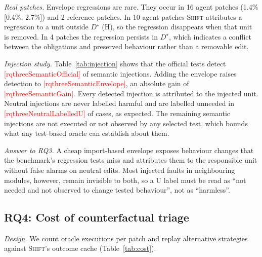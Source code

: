 \documentclass[a4paper,fleqn]{cas-sc}
\newcommand{\tool}{\textsc{Shift}}
\newcommand{\pending}[1]{\textcolor{red}{[#1]}}
\newcommand{\lab}[1]{\textsf{#1}}
\newcommand{\rqthreeAgentHarmful}{10}
\newcommand{\rqthreeAgentRegCI}{[0.4\%, 2.7\%]}
\newcommand{\rqthreeAgentRegMinimal}{4}
\newcommand{\rqthreeAgentRegN}{16}
\newcommand{\rqthreeAgentRegRate}{1.4\%}
\newcommand{\rqthreeGoldRegN}{2}
\newcommand{\rqthreeNeutralLabelledU}{\pending{rqthreeNeutralLabelledU}}
\newcommand{\rqthreeSemanticEnvelope}{\pending{rqthreeSemanticEnvelope}}
\newcommand{\rqthreeSemanticGain}{\pending{rqthreeSemanticGain}}
\newcommand{\rqthreeSemanticOfficial}{\pending{rqthreeSemanticOfficial}}
\begin{document}
\emph{Real patches.} Envelope regressions are rare. They occur in \rqthreeAgentRegN{} agent patches (\rqthreeAgentRegRate{} \rqthreeAgentRegCI{}) and \rqthreeGoldRegN{} reference patches. In \rqthreeAgentHarmful{} agent patches \tool{} attributes a regression to a unit outside $D^\star$ (\lab{H}), so the regression disappears when that unit is removed. In \rqthreeAgentRegMinimal{} patches the regression persists in $D^\star$, which indicates a conflict between the obligations and preserved behaviour rather than a removable edit.


\emph{Injection study.} Table~\ref{tab:injection} shows that the official tests detect \rqthreeSemanticOfficial{} of semantic injections. Adding the envelope raises detection to \rqthreeSemanticEnvelope{}, an absolute gain of \rqthreeSemanticGain{}. Every detected injection is attributed to the injected unit. Neutral injections are never labelled harmful and are labelled unneeded in \rqthreeNeutralLabelledU{} of cases, as expected. The remaining semantic injections are not executed or not observed by any selected test, which bounds what any test-based oracle can establish about them.

\emph{Answer to RQ3.} A cheap import-based envelope exposes behaviour changes that the benchmark's regression tests miss and attributes them to the responsible unit without false alarms on neutral edits. Most injected faults in neighbouring modules, however, remain invisible to both, so a \lab{U} label must be read as ``not needed and not observed to change tested behaviour'', not as ``harmless''.


\subsection{RQ4: Cost of counterfactual triage}\label{sec:rq4}
\emph{Design.} We count oracle executions per patch and replay alternative strategies against \tool{}'s outcome cache (Table~\ref{tab:cost}).
\end{document}
